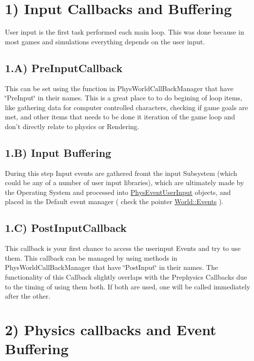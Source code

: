  \hypertarget{dd/d99/mainloop1_callbacks1}{}\section{1) Input Callbacks and Buffering}\label{dd/d99/mainloop1_callbacks1}
User input is the first task performed each main loop. This was done because in most games and simulations everything depends on the user input. \hypertarget{dd/d99/mainloop1_input1}{}\subsection{1.A) PreInputCallback}\label{dd/d99/mainloop1_input1}
This can be set using the function in PhysWorldCallBackManager that have \char`\"{}PreInput\char`\"{} in their names. This is a great place to to do begining of loop items, like gathering data for computer controlled characters, checking if game goals are met, and other items that needs to be done it iteration of the game loop and don't directly relate to physics or Rendering. \hypertarget{dd/d99/mainloop1_input2}{}\subsection{1.B) Input Buffering}\label{dd/d99/mainloop1_input2}
During this step Input events are gathered fromt the input Subsystem (which could be any of a number of user input libraries), which are ultimately made by the Operating System and processed into \hyperlink{classPhysEventUserInput}{PhysEventUserInput} objects, and placed in the Default event manager ( check the pointer \hyperlink{classphys_1_1World_ad0b13f1f3caf0342f56671b522543453}{World::Events} ). \hypertarget{dd/d99/mainloop1_input3}{}\subsection{1.C) PostInputCallback}\label{dd/d99/mainloop1_input3}
This callback is your first chance to access the userinput Events and try to use them. This callback can be managed by using methods in PhysWorldCallBackManager that have \char`\"{}PostInput\char`\"{} in their names. The functionality of this Callback slightly overlaps with the Prephysics Callbacks due to the timing of using them both. If both are used, one will be called immediately after the other. \par
 \hypertarget{dd/d99/mainloop1_callbacks2}{}\section{2) Physics callbacks and Event Buffering}\label{dd/d99/mainloop1_callbacks2}
